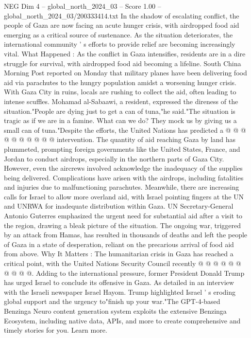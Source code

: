 \begin{textsample}{NEG Dim 4 – global\_north\_2024\_03 – Score 1.00 – global\_north\_2024\_03/200333414.txt}  \label{ex:f4_neg_213}
In the shadow of escalating conflict, the people of Gaza are now facing an acute hunger crisis, with airdropped food aid emerging as a critical source of sustenance.
As the situation deteriorates, the international community ' s efforts to provide relief are becoming increasingly vital.
What Happened : As the conflict in Gaza intensifies, residents are in a dire struggle for survival, with airdropped food aid becoming a lifeline.
South China Morning Post reported on Monday that military planes have been delivering food aid via parachutes to the hungry population amidst a worsening hunger crisis.
With Gaza City in ruins, locals are rushing to collect the aid, often leading to intense scuffles.
Mohamad al-Sabaawi, a resident, expressed the direness of the situation."People are dying just to get a can of tuna,"he said."The situation is tragic as if we are in a famine.
What can we do?
They mock us by giving us a small can of tuna."Despite the efforts, the United Nations has predicted a @ @ @ @ @ @ @ @ @ @ intervention.
The quantity of aid reaching Gaza by land has plummeted, prompting foreign governments like the United States, France, and Jordan to conduct airdrops, especially in the northern parts of Gaza City.
However, even the aircrews involved acknowledge the inadequacy of the supplies being delivered.
Complications have arisen with the airdrops, including fatalities and injuries due to malfunctioning parachutes.
Meanwhile, there are increasing calls for Israel to allow more overland aid, with Israel pointing fingers at the UN and UNRWA for inadequate distribution within Gaza.
UN Secretary-General Antonio Guterres emphasized the urgent need for substantial aid after a visit to the region, drawing a bleak picture of the situation.
The ongoing war, triggered by an attack from Hamas, has resulted in thousands of deaths and left the people of Gaza in a state of desperation, reliant on the precarious arrival of food aid from above.
Why It Matters : The humanitarian crisis in Gaza has reached a critical point, with the United Nations Security Council recently @ @ @ @ @ @ @ @ @ @.
Adding to the international pressure, former President Donald Trump has urged Israel to conclude its offensive in Gaza.
As detailed in an interview with the Israeli newspaper Israel Hayom.
Trump highlighted Israel ' s eroding global support and the urgency to"finish up your war."The GPT-4-based Benzinga Neuro content generation system exploits the extensive Benzinga Ecosystem, including native data, APIs, and more to create comprehensive and timely stories for you.
Learn more.

\end{textsample}
